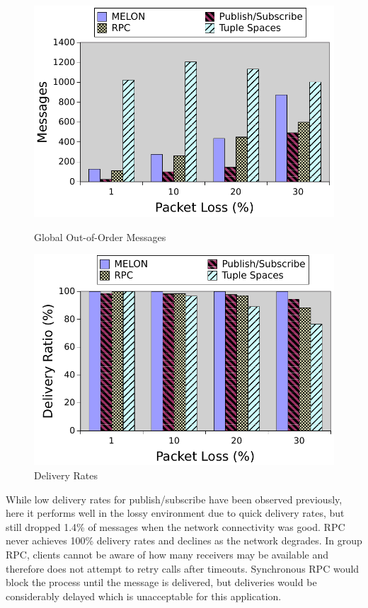 \documentclass{llncs}
\begin{document}
\begin{figure}[ht]
\centering
\begin{minipage}[b]{0.48\linewidth}
\includegraphics[width = \textwidth]{figures/gooo.pdf}
\caption{Global Out-of-Order Messages}
\label{fig:gooo}
\end{minipage}
\quad
\begin{minipage}[b]{0.48\linewidth}
\includegraphics[width = \textwidth]{figures/delivery.pdf}
\caption{Delivery Rates}
\label{fig:delivery}
\end{minipage}
\end{figure}

While low delivery rates for publish/subscribe have been observed previously\cite{collins2010quantitative}, here it performs well in the lossy environment due to quick delivery rates, but still dropped 1.4\% of messages when the network connectivity was good. RPC never achieves 100\% delivery rates and declines as the network degrades. In group RPC, clients cannot be aware of how many receivers may be available and therefore does not attempt to retry calls after timeouts. Synchronous RPC would block the process until the message is delivered, but deliveries would be considerably delayed which is unacceptable for this application.
\end{document}
